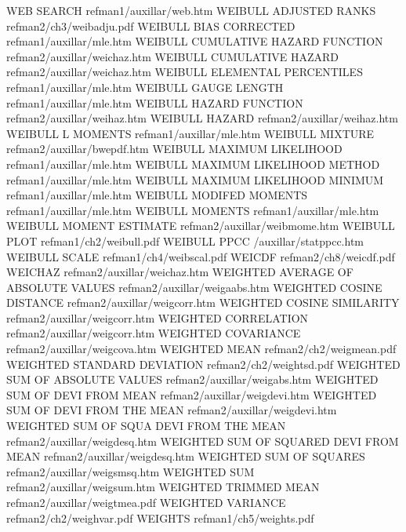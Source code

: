 WEB SEARCH                              refman1/auxillar/web.htm
WEIBULL ADJUSTED RANKS                  refman2/ch3/weibadju.pdf
WEIBULL BIAS CORRECTED                  refman1/auxillar/mle.htm
WEIBULL CUMULATIVE HAZARD FUNCTION      refman2/auxillar/weichaz.htm
WEIBULL CUMULATIVE HAZARD               refman2/auxillar/weichaz.htm
WEIBULL ELEMENTAL PERCENTILES           refman1/auxillar/mle.htm
WEIBULL GAUGE LENGTH                    refman1/auxillar/mle.htm
WEIBULL HAZARD FUNCTION                 refman2/auxillar/weihaz.htm
WEIBULL HAZARD                          refman2/auxillar/weihaz.htm
WEIBULL L MOMENTS                       refman1/auxillar/mle.htm
WEIBULL MIXTURE                         refman2/auxillar/bwepdf.htm
WEIBULL MAXIMUM LIKELIHOOD              refman1/auxillar/mle.htm
WEIBULL MAXIMUM LIKELIHOOD METHOD       refman1/auxillar/mle.htm
WEIBULL MAXIMUM LIKELIHOOD MINIMUM      refman1/auxillar/mle.htm
WEIBULL MODIFED MOMENTS                 refman1/auxillar/mle.htm
WEIBULL MOMENTS                         refman1/auxillar/mle.htm
WEIBULL MOMENT ESTIMATE                 refman2/auxillar/weibmome.htm
WEIBULL PLOT                            refman1/ch2/weibull.pdf
WEIBULL PPCC                            /auxillar/statppcc.htm
WEIBULL SCALE                           refman1/ch4/weibscal.pdf
WEICDF                                  refman2/ch8/weicdf.pdf
WEICHAZ                                 refman2/auxillar/weichaz.htm
WEIGHTED AVERAGE OF ABSOLUTE VALUES     refman2/auxillar/weigaabs.htm
WEIGHTED COSINE DISTANCE                refman2/auxillar/weigcorr.htm
WEIGHTED COSINE SIMILARITY              refman2/auxillar/weigcorr.htm
WEIGHTED CORRELATION                    refman2/auxillar/weigcorr.htm
WEIGHTED COVARIANCE                     refman2/auxillar/weigcova.htm
WEIGHTED MEAN                           refman2/ch2/weigmean.pdf
WEIGHTED STANDARD DEVIATION             refman2/ch2/weightsd.pdf
WEIGHTED SUM OF ABSOLUTE VALUES         refman2/auxillar/weigabs.htm
WEIGHTED SUM OF DEVI FROM MEAN          refman2/auxillar/weigdevi.htm
WEIGHTED SUM OF DEVI FROM THE MEAN      refman2/auxillar/weigdevi.htm
WEIGHTED SUM OF SQUA DEVI FROM THE MEAN refman2/auxillar/weigdesq.htm
WEIGHTED SUM OF SQUARED DEVI FROM MEAN  refman2/auxillar/weigdesq.htm
WEIGHTED SUM OF SQUARES                 refman2/auxillar/weigsmsq.htm
WEIGHTED SUM                            refman2/auxillar/weigsum.htm
WEIGHTED TRIMMED MEAN                   refman2/auxillar/weigtmea.pdf
WEIGHTED VARIANCE                       refman2/ch2/weighvar.pdf
WEIGHTS                                 refman1/ch5/weights.pdf
